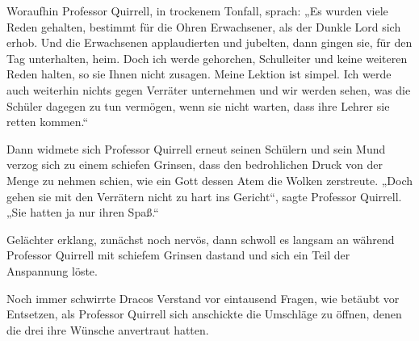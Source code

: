 Woraufhin Professor Quirrell, in trockenem Tonfall, sprach:
„Es wurden viele Reden gehalten, bestimmt für die Ohren Erwachsener, als der Dunkle Lord sich erhob. Und die Erwachsenen applaudierten und jubelten, dann gingen sie, für den Tag unterhalten, heim. Doch ich werde gehorchen, Schulleiter und keine weiteren Reden halten, so sie Ihnen nicht zusagen. Meine Lektion ist simpel. Ich werde auch weiterhin nichts gegen Verräter unternehmen und wir werden sehen, was die Schüler dagegen zu tun vermögen, wenn sie nicht warten, dass ihre Lehrer sie retten kommen.“

Dann widmete sich Professor Quirrell erneut seinen Schülern und sein Mund verzog sich zu einem schiefen Grinsen, dass den bedrohlichen Druck von der Menge zu nehmen schien, wie ein Gott dessen Atem die Wolken zerstreute.
„Doch gehen sie mit den Verrätern nicht zu hart ins Gericht“, sagte Professor Quirrell.
„Sie hatten ja nur ihren Spaß.“

Gelächter erklang, zunächst noch nervös, dann schwoll es langsam an während Professor Quirrell mit schiefem Grinsen dastand und sich ein Teil der Anspannung löste.

\later

Noch immer schwirrte Dracos Verstand vor eintausend Fragen, wie betäubt vor Entsetzen, als Professor Quirrell sich anschickte die Umschläge zu öffnen, denen die drei ihre Wünsche anvertraut hatten.

